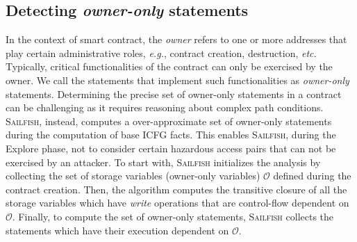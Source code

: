 \documentclass[conference, romanappendices]{tex/IEEEtran}
\theoremstyle{bfnote}
\newcommand{\toolname}{\textsc{Sailfish}\xspace}
\newcommand{\explore}{{\sc Explore}\xspace}
\newcommand{\smart}{smart contract}
\newcommand{\haz}{{hazardous access}\xspace}
\newcommand{\etc}{\textit{etc.}}
\newcommand{\eg}{\textit{e.g.}}
\begin{document}
\subsection{Detecting \textit{owner-only} statements}
\label{app:owner_only_statements}
In the context of \smart, the \textit{owner} refers to one or more addresses that play certain administrative roles, \eg, contract creation, destruction, \etc{}
Typically, critical functionalities of the contract can only be exercised by the owner.
We call the statements that implement such functionalities as \textit{owner-only} statements.
Determining the precise set of owner-only statements in a contract can be challenging as it requires reasoning about complex path conditions.
\toolname, instead, computes a over-approximate set of owner-only statements during the computation of base {ICFG\EndAccSupp{}} facts.
This enables \toolname, during the \explore phase, not to consider certain \haz pairs that can not be exercised by an attacker.
To start with, \toolname initializes the analysis by collecting the set of storage variables (owner-only variables) $\mathcal{O}$ defined during the contract creation.
Then, the algorithm computes the transitive closure of all the storage variables which have \textit{write} operations that are control-flow dependent on $\mathcal{O}$.
Finally, to compute the set of owner-only statements, \toolname collects the statements which have their execution dependent on $\mathcal{O}$.
 
\end{document}
